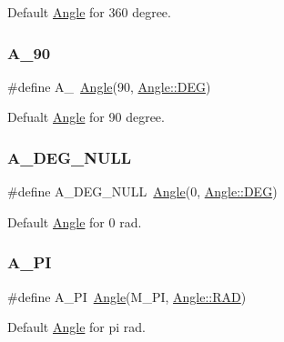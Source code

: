 Default \mbox{\hyperlink{class_angle}{Angle}} for 360 degree. 

\mbox{\label{maths_8hh_ae49ec00d228075202319f793f89e39b5}} 
\subsubsection{\texorpdfstring{A\_90}{A\_90}}
{\footnotesize\ttfamily \#define A\+\_~\mbox{\hyperlink{class_angle}{Angle}}(90, \mbox{\hyperlink{class_angle_a4f7b9849ce8780bcba95ca3ee45cff77a65e2aa4bc05730c9c2e8fdaf73612282}{Angle\+::\+D\+EG}})}



Defualt \mbox{\hyperlink{class_angle}{Angle}} for 90 degree. 

\mbox{\label{maths_8hh_abc6a1d62385f5e3f01509c97666fbbbb}} 
\subsubsection{\texorpdfstring{A\_DEG\_NULL}{A\_DEG\_NULL}}
{\footnotesize\ttfamily \#define A\+\_\+\+D\+E\+G\+\_\+\+N\+U\+LL~\mbox{\hyperlink{class_angle}{Angle}}(0, \mbox{\hyperlink{class_angle_a4f7b9849ce8780bcba95ca3ee45cff77a65e2aa4bc05730c9c2e8fdaf73612282}{Angle\+::\+D\+EG}})}



Default \mbox{\hyperlink{class_angle}{Angle}} for 0 rad. 

\mbox{\label{maths_8hh_ad37649758ce967343cee82772583fd9c}} 
\subsubsection{\texorpdfstring{A\_PI}{A\_PI}}
{\footnotesize\ttfamily \#define A\+\_\+\+PI~\mbox{\hyperlink{class_angle}{Angle}}(M\+\_\+\+PI, \mbox{\hyperlink{class_angle_a4f7b9849ce8780bcba95ca3ee45cff77a93ab6b68075fd7a6fe724fbde5b13c1f}{Angle\+::\+R\+AD}})}



Default \mbox{\hyperlink{class_angle}{Angle}} for pi rad. 

\mbox{\label{maths_8hh_a73d408ce54489e86b860679af5d24059}} 
